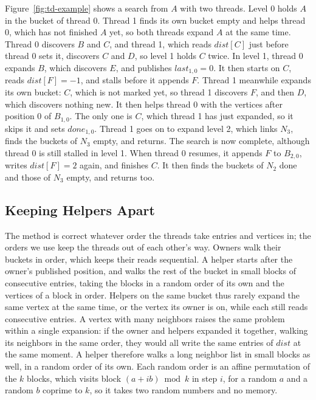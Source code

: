 Figure~\ref{fig:td-example} shows a search from $A$ with two threads. Level 0 holds $A$ in the bucket of thread 0. Thread 1 finds its own bucket empty and helps thread 0, which has not finished $A$ yet, so both threads expand $A$ at the same time. Thread 0 discovers $B$ and $C$, and thread 1, which reads $\mathit{dist}[C]$ just before thread 0 sets it, discovers $C$ and $D$, so level 1 holds $C$ twice. In level 1, thread 0 expands $B$, which discovers $E$, and publishes $\mathit{last}_{1,0} = 0$. It then starts on $C$, reads $\mathit{dist}[F] = -1$, and stalls before it appends $F$. Thread 1 meanwhile expands its own bucket: $C$, which is not marked yet, so thread 1 discovers $F$, and then $D$, which discovers nothing new. It then helps thread 0 with the vertices after position 0 of $B_{1,0}$. The only one is $C$, which thread 1 has just expanded, so it skips it and sets $\mathit{done}_{1,0}$. Thread 1 goes on to expand level 2, which links $N_3$, finds the buckets of $N_3$ empty, and returns. The search is now complete, although thread 0 is still stalled in level 1. When thread 0 resumes, it appends $F$ to $B_{2,0}$, writes $\mathit{dist}[F] = 2$ again, and finishes $C$. It then finds the buckets of $N_2$ done and those of $N_3$ empty, and returns too.

\subsection{Keeping Helpers Apart}
\label{sec:td-contention}

The method is correct whatever order the threads take entries and vertices in; the orders we use keep the threads out of each other's way. Owners walk their buckets in order, which keeps their reads sequential. A helper starts after the owner's published position, and walks the rest of the bucket in small blocks of consecutive entries, taking the blocks in a random order of its own and the vertices of a block in order. Helpers on the same bucket thus rarely expand the same vertex at the same time, or the vertex its owner is on, while each still reads consecutive entries. A vertex with many neighbors raises the same problem within a single expansion: if the owner and helpers expanded it together, walking its neighbors in the same order, they would all write the same entries of $\mathit{dist}$ at the same moment. A helper therefore walks a long neighbor list in small blocks as well, in a random order of its own. Each random order is an affine permutation of the $k$ blocks, which visits block $(a + i b) \bmod k$ in step $i$, for a random $a$ and a random $b$ coprime to $k$, so it takes two random numbers and no memory.
